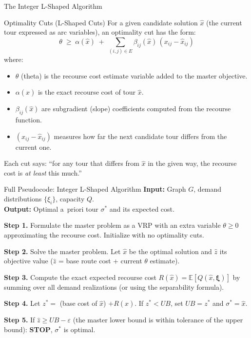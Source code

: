 \documentclass[aspectratio=169,10pt]{beamer}
\begin{document}
\begin{frame}[allowframebreaks]{The Integer L-Shaped Algorithm}
  \begin{block}{Optimality Cuts (L-Shaped Cuts)}
    For a given candidate solution $\hat{x}$ (the current tour expressed
    as arc variables), an optimality cut has the form:
    \[
      \theta \;\geq\; \alpha(\hat{x}) \;+\;
      \sum_{(i,j)\in E} \beta_{ij}(\hat{x})\,(x_{ij} - \hat{x}_{ij})
    \]
    where:
    \begin{itemize}
      \item $\theta$ (theta) is the recourse cost estimate variable added
            to the master objective.
      \item $\alpha(\hat{x})$ is the exact recourse cost of tour $\hat{x}$.
      \item $\beta_{ij}(\hat{x})$ are subgradient (slope) coefficients
            computed from the recourse function.
      \item $(x_{ij} - \hat{x}_{ij})$ measures how far the next candidate
            tour differs from the current one.
    \end{itemize}
    Each cut says: ``for any tour that differs from $\hat{x}$ in the given
    way, the recourse cost is \emph{at least} this much.''
  \end{block}

  \framebreak

  \begin{block}{Full Pseudocode: Integer L-Shaped Algorithm}
    \textbf{Input:} Graph $G$, demand distributions $\{\xi_i\}$, capacity $Q$.\\
    \textbf{Output:} Optimal a~priori tour $\sigma^*$ and its expected cost.

    \medskip
    \textbf{Step 1.} Formulate the master problem as a VRP with an extra
    variable $\theta \geq 0$ approximating the recourse cost. Initialize
    with no optimality cuts.

    \textbf{Step 2.} Solve the master problem. Let $\hat{x}$ be the
    optimal solution and $\hat{z}$ its objective value ($\hat{z}$ = base
    route cost + current $\theta$ estimate).

    \textbf{Step 3.} Compute the exact expected recourse cost
    $R(\hat{x}) = \mathbb{E}[Q(\hat{x}, \boldsymbol{\xi})]$ by summing
    over all demand realizations (or using the separability formula).

    \textbf{Step 4.} Let $z^* = $ (base cost of $\hat{x}$) $+ R(\hat{x})$.
    If $z^* < UB$, set $UB = z^*$ and $\sigma^* = \hat{x}$.

    \textbf{Step 5.} If $\hat{z} \geq UB - \varepsilon$ (the master lower
    bound is within tolerance of the upper bound): \textbf{STOP}, $\sigma^*$
    is optimal.


\end{block}
\end{frame}
\end{document}
